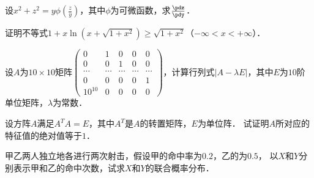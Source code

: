 \documentclass[plain,noanswer,medmath]{../../template/jnuexam}
\begin{document}
\begin{problem}
设$x^2+z^2=y\phi \left(\frac{z}{y} \right)$，其中$\phi$为可微函数，求$\frac{\pdz}{\pdy}$．
\end{problem}










\begin{problem}
证明不等式$1+x\ln(x+\sqrt{1+x^2}) \ge \sqrt{1+x^2}$（$-\infty <x<+\infty$）．
\end{problem}




\begin{problem}
设$A$为$10\times 10$矩阵$\begin{pmatrix}
        0 &      1 &      0 &      0 & 0 \\
        0 &      0 &      1 &      0 & 0 \\
   \cdots & \cdots & \cdots & \cdots & \cdots \\
        0 &      0 &      0 &      0 & 1 \\
  10^{10} &      0 &      0 &      0 & 0
\end{pmatrix}$，计算行列式$|A-\lambda E|$，其中$E$为$10$阶单位矩阵，$\lambda$为常数．
\end{problem}




\begin{problem}
设方阵$A$满足$A^TA=E$，其中$A^T$是$A$的转置矩阵，$E$为单位阵．
试证明$A$所对应的特征值的绝对值等于$1$．
\end{problem}










\begin{problem}
甲乙两人独立地各进行两次射击，假设甲的命中率为$0.2$，乙的为$0.5$，
以$X$和$Y$分别表示甲和乙的命中次数，试求$X$和$Y$的联合概率分布．
\end{problem}



\end{document}

